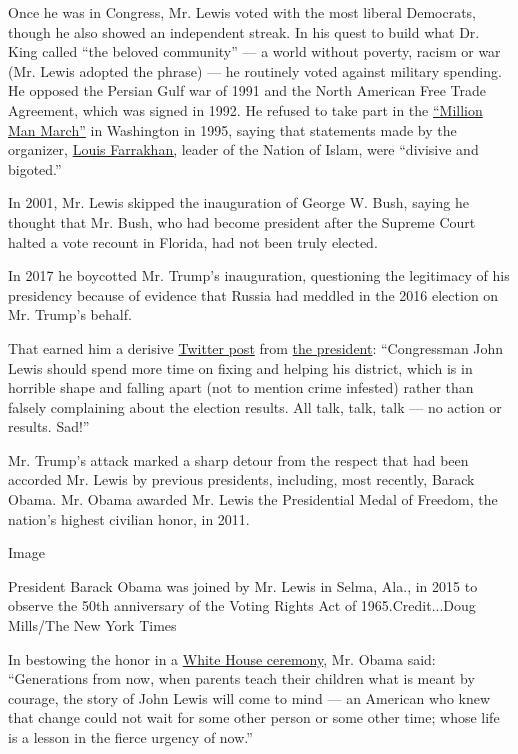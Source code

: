 Once he was in Congress, Mr. Lewis voted with the most liberal
Democrats, though he also showed an independent streak. In his quest to
build what Dr. King called ``the beloved community'' --- a world without
poverty, racism or war (Mr. Lewis adopted the phrase) --- he routinely
voted against military spending. He opposed the Persian Gulf war of 1991
and the North American Free Trade Agreement, which was signed in 1992.
He refused to take part in the
\href{https://www.britannica.com/event/Million-Man-March}{``Million Man
March''} in Washington in 1995, saying that statements made by the
organizer,
\href{https://www.nytimes.com/2018/03/09/us/louis-farrakhan-facts-history.html?smid=fb-nytimes\&smtyp=cur\&fbclid=IwAR0hOQH--3CNneVBqRv4lvO0uwg1rgo2r4OFACTuZQN4ZjROabr8hWpfhOs}{Louis
Farrakhan,} leader of the Nation of Islam, were ``divisive and
bigoted.''

In 2001, Mr. Lewis skipped the inauguration of George W. Bush, saying he
thought that Mr. Bush, who had become president after the Supreme Court
halted a vote recount in Florida, had not been truly elected.

In 2017 he boycotted Mr. Trump's inauguration, questioning the
legitimacy of his presidency because of evidence that Russia had meddled
in the 2016 election on Mr. Trump's behalf.

That earned him a derisive
\href{https://twitter.com/realDonaldTrump/status/820251730407473153}{Twitter
post} from
\href{https://twitter.com/realDonaldTrump/status/820255947956383744}{the
president}: ``Congressman John Lewis should spend more time on fixing
and helping his district, which is in horrible shape and falling apart
(not to mention crime infested) rather than falsely complaining about
the election results. All talk, talk, talk --- no action or results.
Sad!''

Mr. Trump's attack marked a sharp detour from the respect that had been
accorded Mr. Lewis by previous presidents, including, most recently,
Barack Obama. Mr. Obama awarded Mr. Lewis the Presidential Medal of
Freedom, the nation's highest civilian honor, in 2011.

Image

President Barack Obama was joined by Mr. Lewis in Selma, Ala., in 2015
to observe the 50th anniversary of the Voting Rights Act of
1965.Credit...Doug Mills/The New York Times

In bestowing the honor in a
\href{https://obamawhitehouse.archives.gov/the-press-office/2011/02/15/remarks-president-honoring-recipients-2010-medal-freedom}{White
House ceremony}, Mr. Obama said: ``Generations from now, when parents
teach their children what is meant by courage, the story of John Lewis
will come to mind --- an American who knew that change could not wait
for some other person or some other time; whose life is a lesson in the
fierce urgency of now.''

